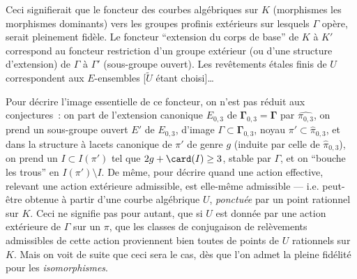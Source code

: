 Ceci signifierait que le foncteur des courbes algébriques sur $K$ (morphismes les morphismes dominants) vers les groupes profinis extérieurs sur lesquels $\Gamma$ opère, serait pleinement fidèle.  Le foncteur ``extension du corps de base'' de $K$ à $K'$ correspond au foncteur restriction d'un groupe extérieur (ou d'une structure d'extension) de $\Gamma$ à $\Gamma'$ (sous-groupe ouvert). Les revêtements étales finis de $U$ correspondent aux $E$-ensembles [$\tilde{U}$ étant choisi]\dots

Pour décrire l'image essentielle de ce foncteur, on n'est pas réduit aux conjectures~: on part de l'extension canonique $E_{0,3}$ de $\boldsymbol{\Gamma}_{0,3}=\boldsymbol{\Gamma}$ par $\hat{\pi_{0,3}}$, on prend un sous-groupe ouvert $E'$ de $E_{0,3}$, d'image $\Gamma \subset \boldsymbol{\Gamma}_{0,3}$, noyau $\pi'\subset \hat{\pi}_{0,3}$, et dans la structure à lacets canonique de $\pi'$ de genre $g$ (induite par celle de $\hat{\pi}_{0,3}$), on prend un $I \subset  I(\pi')$ tel que $2g + \card(I) \ge 3$, stable par $\Gamma$, et on ``bouche les trous'' en $I(\pi') \setminus I$. De même, pour décrire quand une action effective, relevant une action extérieure admissible, est elle-même admissible --- i.e. peut-être obtenue à partir d'une courbe algébrique $U$, \emph{ponctuée} par un point rationnel sur $K$. Ceci ne signifie pas pour autant, que si $U$ est donnée par une action extérieure de $\Gamma$ sur un $\pi$, que les classes de conjugaison de relèvements admissibles de cette action proviennent bien toutes de points de $U$ rationnels sur $K$.  Mais on voit de suite que ceci sera le cas, dès que l'on admet la pleine fidélité pour les \emph{isomorphismes}.


